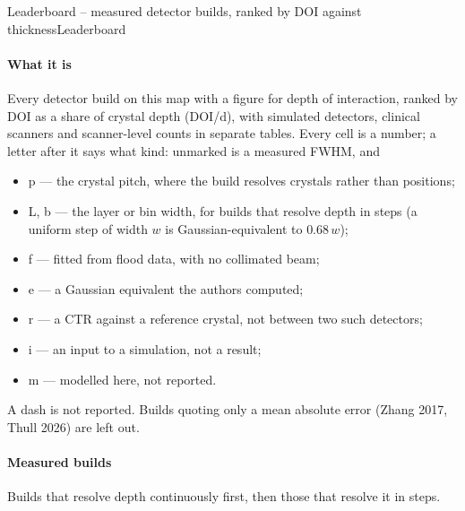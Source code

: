 
\begin{programnote}{Leaderboard -- measured detector builds, ranked by DOI against thickness}{Leaderboard}

\paragraph{What it is}
Every detector build on this map with a figure for depth of interaction,
ranked by DOI as a share of crystal depth (DOI/d), with simulated detectors,
clinical scanners and scanner-level counts in separate tables. Every cell is a
number; a letter after it says what kind: unmarked is a measured FWHM, and
\begin{itemize}
	\item p --- the crystal pitch, where the build resolves crystals rather than
		positions;
	\item L, b --- the layer or bin width, for builds that resolve depth in
		steps (a uniform step of width $w$ is Gaussian-equivalent to $0.68\,w$);
	\item f --- fitted from flood data, with no collimated beam;
	\item e --- a Gaussian equivalent the authors computed;
	\item r --- a CTR against a reference crystal, not between two such
		detectors;
	\item i --- an input to a simulation, not a result;
	\item m --- modelled here, not reported.
\end{itemize}
A dash is not reported. Builds quoting only a mean absolute error (Zhang 2017,
Thull 2026) are left out.

\paragraph{Measured builds}
Builds that resolve depth continuously first, then those that resolve it in
steps.


\end{programnote}
